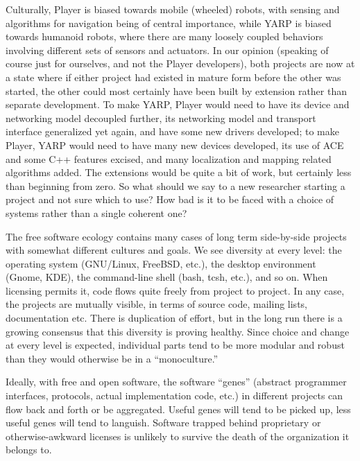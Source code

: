Culturally, Player is biased towards mobile (wheeled) robots, with
sensing and algorithms for navigation being of central importance,
while YARP is biased towards humanoid robots, where there are many
loosely coupled behaviors involving different sets of sensors and
actuators.
%
In our opinion (speaking of course just for ourselves, and not the
Player developers), both projects are now at a state where if either
project had existed in mature form before the other was started, the
other could most certainly have been built by extension rather than 
separate development.
%
To make YARP, Player would need to have its device and networking
model decoupled further, its networking model and transport interface
generalized yet again, and have some new drivers developed; to make
Player, YARP would need to have many new devices developed, its use of
ACE and some C++ features excised, and many localization and mapping
related algorithms added.
%
The extensions would be quite a bit of work, but
certainly less than beginning from zero.
%
So what should we say to a new researcher starting a project and not
sure which to use?
%
How bad is it to be faced with a choice of systems rather than
a single coherent one?

%
%

The free software ecology contains many cases of long term
side-by-side projects with somewhat different cultures and goals.  We
see diversity at every level: the operating system (GNU/Linux,
FreeBSD, etc.), the desktop environment (Gnome, KDE), the command-line
shell (bash, tcsh, etc.), and so on.  When licensing permits it, code
flows quite freely from project to project.  In any case, the projects
are mutually visible, in terms of source code, mailing lists,
documentation etc.  There is duplication of effort, but in the long
run there is a growing consensus that this diversity is proving
healthy.  Since choice and change at every level is expected,
individual parts tend to be more modular and robust than they would
otherwise be in a ``monoculture.''

Ideally, with free and open software, the software ``genes'' (abstract
programmer interfaces, protocols, actual implementation code, etc.)
in different projects can flow back and forth or be aggregated.
Useful genes will tend to be picked up, less useful genes will tend to
languish.  Software trapped behind proprietary or otherwise-awkward
licenses is unlikely to survive the death of the organization it
belongs to.

